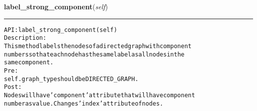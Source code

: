     \label{coinor:gimpy:graph:Graph:label_strong_component}

    \vspace{0.5ex}

\hspace{.8\funcindent}\begin{boxedminipage}{\funcwidth}

    \raggedright \textbf{label\_strong\_component}(\textit{self})

    \vspace{-1.5ex}

    \rule{\textwidth}{0.5\fboxrule}
\setlength{\parskip}{2ex}
\begin{alltt}

API: label\_strong\_component(self)
Description:
This method labels the nodes of a directed graph with component
numbers so that each node has the same label as all nodes in the
same component.
Pre:
    self.graph\_type should be DIRECTED\_GRAPH.
Post:
    Nodes will have 'component' attribute that will have component
    number as value. Changes 'index' attribute of nodes.
\end{alltt}

\setlength{\parskip}{1ex}
    \end{boxedminipage}

    \label{coinor:gimpy:graph:Graph:dfs}

    \vspace{0.5ex}

